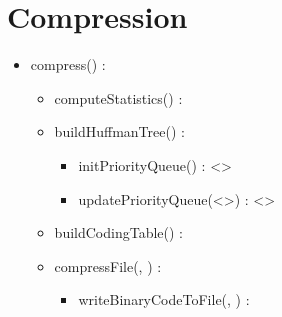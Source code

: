 \section{Compression}


\begin{itemize}
    \item compress(\binaryFile) : \binaryFile
    \begin{itemize}
        \item computeStatistics(\binaryFile) : \statistics
        \item buildHuffmanTree(\statistics) : \huffmanTree
        \begin{itemize}
            \item initPriorityQueue(\statistics) : \priorityQueue<\huffmanTree>
            \item updatePriorityQueue(\priorityQueue<\huffmanTree>) : \priorityQueue<\huffmanTree>
        \end{itemize}
        \item buildCodingTable(\huffmanTree) : \codingTable
        \item compressFile(\binaryFile, \codingTable) : \binaryFile
        \begin{itemize}
            \item writeBinaryCodeToFile(\binaryFile, \binaryCode) : \binaryFile
        \end{itemize}
    \end{itemize}
\end{itemize}

